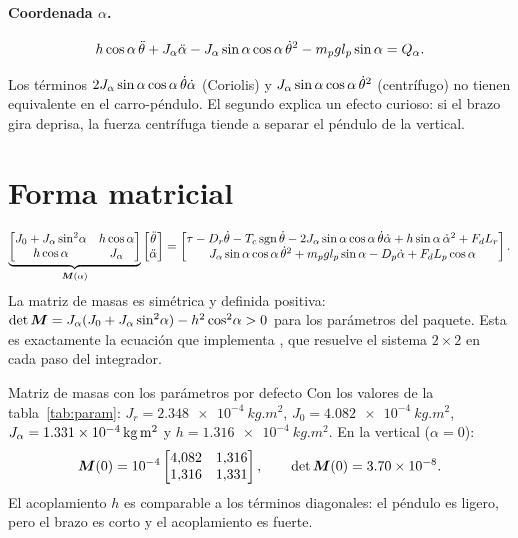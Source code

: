 \paragraph{Coordenada $\alpha$.}
\begin{equation}
  h\cos\alpha\,\ddot{\theta} + J_\alpha\ddot{\alpha} - J_\alpha\sin\alpha\cos\alpha\,\dot{\theta}^2 - m_pgl_p\sin\alpha = Q_\alpha .
  \label{eq:el2}
\end{equation}

Los términos $2J_\alpha\sin\alpha\cos\alpha\,\dot{\theta}\dot{\alpha}$ (Coriolis) y $J_\alpha\sin\alpha\cos\alpha\,\dot{\theta}^2$ (centrífugo) no tienen equivalente en el carro-péndulo. El segundo explica un efecto curioso: si el brazo gira deprisa, la fuerza centrífuga tiende a separar el péndulo de la vertical.

\section{Forma matricial}

\begin{equation}
  \underbrace{\begin{bmatrix} J_0+J_\alpha\sin^2\!\alpha & h\cos\alpha\\ h\cos\alpha & J_\alpha\end{bmatrix}}_{\bm{M}(\alpha)}
  \begin{bmatrix}\ddot{\theta}\\ \ddot{\alpha}\end{bmatrix}
  =
  \begin{bmatrix}
    \tau - D_r\dot{\theta} - T_c\operatorname{sgn}\dot{\theta} - 2J_\alpha\sin\alpha\cos\alpha\,\dot{\theta}\dot{\alpha} + h\sin\alpha\,\dot{\alpha}^2 + F_dL_r\\
    J_\alpha\sin\alpha\cos\alpha\,\dot{\theta}^2 + m_pgl_p\sin\alpha - D_p\dot{\alpha} + F_dL_p\cos\alpha
  \end{bmatrix}.
  \label{eq:nl}
\end{equation}
La matriz de masas es simétrica y definida positiva: $\det\bm{M} = J_\alpha(J_0+J_\alpha\sin^2\!\alpha) - h^2\cos^2\!\alpha>0$ para los parámetros del paquete. Esta es exactamente la ecuación que implementa , que resuelve el sistema $2\times2$ en cada paso del integrador.

\begin{ejemplo}{Matriz de masas con los parámetros por defecto}
Con los valores de la tabla~\ref{tab:param}: $J_r=\SI{2.348e-4}{kg.m^2}$, $J_0=\SI{4.082e-4}{kg.m^2}$, $J_\alpha=\SI{1.331e-4}{kg.m^2}$ y $h=\SI{1.316e-4}{kg.m^2}$. En la vertical ($\alpha=0$):
\[
\bm{M}(0)=10^{-4}\begin{bmatrix}4{,}082 & 1{,}316\\ 1{,}316 & 1{,}331\end{bmatrix},\qquad \det\bm{M}(0)=\num{3.70e-8}.
\]
El acoplamiento $h$ es comparable a los términos diagonales: el péndulo es ligero, pero el brazo es corto y el acoplamiento es fuerte.
\end{ejemplo}

